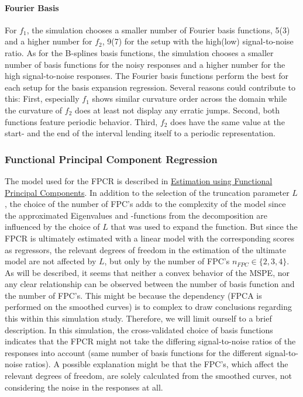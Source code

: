 \documentclass[11pt,twoside,a4paper]{article}
\begin{document}
	\paragraph{Fourier Basis}
	For $f_1$, the simulation chooses a smaller number of Fourier basis functions, 5(3) and a higher number for $f_2$, 9(7) for the setup with the high(low) signal-to-noise ratio. As for the B-splines basis functions, the simulation chooses a smaller number of basis functions for the noisy responses and a higher number for the high signal-to-noise responses. The Fourier basis functions perform the best for each setup for the basis expansion regression. Several reasons could contribute to this: First, especially $f_1$ shows similar curvature order across the domain while the curvature of $f_2$ does at least not display any erratic jumps. Second, both functions feature periodic behavior. Third, $f_2$ does have the same value at the start- and the end of the interval lending itself to a periodic representation.	\\
	
	\subsubsection{Functional Principal Component Regression}
		The model used for the FPCR is described in \hyperref[fpc_exp_transf]{Estimation using Functional Principal Components}. In addition to the selection of the truncation parameter $L$, the choice of the number of FPC's adds to the complexity of the model since the approximated Eigenvalues and -functions from the decomposition are influenced by the choice of $L$ that was used to expand the function. But since the FPCR is ultimately estimated with a linear model with the corresponding scores as regressors, the relevant degrees of freedom in the estimation of the ultimate model are not affected by $L$, but only by the number of FPC's $n_{FPC} \in \{2, 3, 4 \}$. As will be described, it seems that neither a convex behavior of the MSPE, nor any clear relationship can be observed between the number of basis function and the number of FPC's. This might be because the dependency (FPCA is performed on the smoothed curves) is to complex to draw conclusions regarding this within this simulation study. Therefore, we will limit ourself to a brief description. In this simulation, the cross-validated choice of basis functions indicates that the FPCR might not take the differing signal-to-noise ratios of the responses into account (same number of basis functions for the different signal-to-noise ratios). A possible explanation might be that the FPC's, which affect the relevant degrees of freedom, are solely calculated from the smoothed curves, not considering the noise in the responses at all.
	
\end{document}
